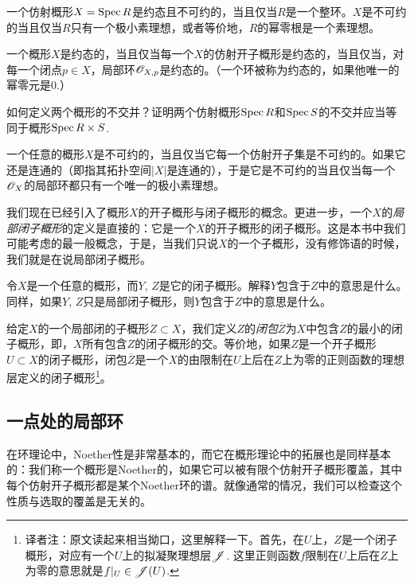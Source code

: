 \begin{exe}
	一个仿射概形$X=\operatorname{Spec} R$是约态且不可约的，当且仅当$R$是一个整环。$X$是不可约的当且仅当$R$只有一个极小素理想，或者等价地，$R$的幂零根是一个素理想。
\end{exe}

\begin{exe}
	一个概形$X$是约态的，当且仅当每一个$X$的仿射开子概形是约态的，当且仅当，对每一个闭点$p\in X$，局部环$\mathscr{O}_{X,p}$是约态的。（一个环被称为约态的，如果他唯一的幂零元是$0$.）
\end{exe}

\begin{exe}
	如何定义两个概形的不交并？证明两个仿射概形$\operatorname{Spec} R$和$\operatorname{Spec} S$的不交并应当等同于概形$\operatorname{Spec} R\times S$.
\end{exe}

\begin{exe}
	一个任意的概形$X$是不可约的，当且仅当它每一个仿射开子集是不可约的。如果它还是连通的（即指其拓扑空间$|X|$是连通的），于是它是不可约的当且仅当每一个$\mathscr{O}_X$的局部环都只有一个唯一的极小素理想。
\end{exe}

我们现在已经引入了概形$X$的开子概形与闭子概形的概念。更进一步，一个$X$的\textit{局部闭子概形}的定义是直接的：它是一个$X$的开子概形的闭子概形。这是本书中我们可能考虑的最一般概念，于是，当我们只说$X$的一个子概形，没有修饰语的时候，我们就是在说局部闭子概形。

\begin{exe}
令$X$是一个任意的概形，而$Y$, $Z$是它的闭子概形。解释$Y$包含于$Z$中的意思是什么。同样，如果$Y$, $Z$只是局部闭子概形，则$Y$包含于$Z$中的意思是什么。
\end{exe}

给定$X$的一个局部闭的子概形$Z\subset X$，我们定义$Z$的\textit{闭包}$\overline{Z}$为$X$中包含$Z$的最小的闭子概形，即，$X$所有包含$Z$的闭子概形的交。等价地，如果$Z$是一个开子概形$U\subset X$的闭子概形，闭包$\overline{Z}$是一个$X$的由限制在$U$上后在$Z$上为零的正则函数的理想层定义的闭子概形\footnote{译者注：原文读起来相当拗口，这里解释一下。首先，在$U$上，$Z$是一个闭子概形，对应有一个$U$上的拟凝聚理想层$\mathscr{J}$. 这里正则函数$f$限制在$U$上后在$Z$上为零的意思就是$f|_U\in \mathscr{J}(U)$.}。

\subsection{一点处的局部环} \label{s:1.2.2}

在环理论中，Noether性是非常基本的，而它在概形理论中的拓展也是同样基本的：我们称一个概形是Noether的，如果它可以被有限个仿射开子概形覆盖，其中每个仿射开子概形都是某个Noether环的谱。就像通常的情况，我们可以检查这个性质与选取的覆盖是无关的。


